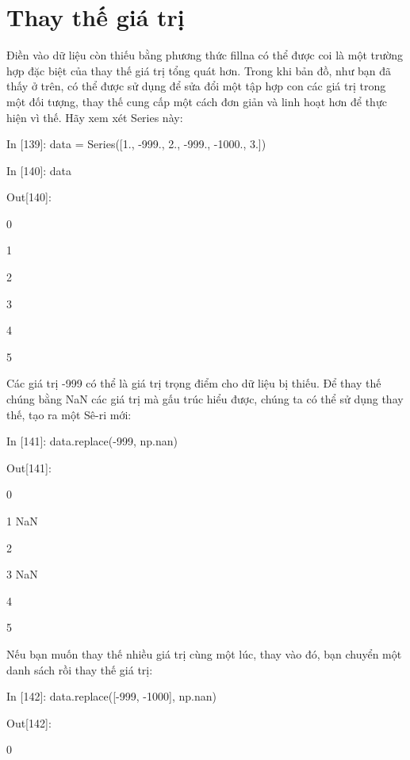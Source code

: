 \section{Thay thế giá trị}
Điền vào dữ liệu còn thiếu bằng phương thức fillna có thể được coi là một trường hợp đặc biệt của 
thay thế giá trị tổng quát hơn. Trong khi bản đồ, như bạn đã thấy ở trên, có thể được sử dụng để sửa đổi 
một tập hợp con các giá trị trong một đối tượng, thay thế cung cấp một cách đơn giản và linh hoạt hơn để thực hiện 
vì thế. Hãy xem xét Series này:\par
    \quad\textup{In [139]: data = Series([1., -999., 2., -999., -1000., 3.])  }\par
    \quad\textup{In [140]: data   }\par
    \quad\textup{Out[140]: }\par
    \quad\textup{0  }\par
    \quad\textup{1    }\par
    \quad\textup{2  }\par
    \quad\textup{3   }\par
    \quad\textup{4  }\par
    \quad\textup{5  }\par
Các giá trị -999 có thể là giá trị trọng điểm cho dữ liệu bị thiếu. Để thay thế chúng bằng NaN 
các giá trị mà gấu trúc hiểu được, chúng ta có thể sử dụng thay thế, tạo ra một Sê-ri mới: \par
    \quad\textup{In [141]: data.replace(-999, np.nan)}\par
    \quad\textup{Out[141]:    }\par
    \quad\textup{0    }\par
    \quad\textup{1   \quad  NaN  }\par
    \quad\textup{2  }\par
    \quad\textup{3  \quad NaN }\par
    \quad\textup{4  }\par
    \quad\textup{5  }\par
Nếu bạn muốn thay thế nhiều giá trị cùng một lúc, thay vào đó, bạn chuyển một danh sách rồi thay thế giá trị: \par
    \quad\textup{In [142]: data.replace([-999, -1000], np.nan)}\par
    \quad\textup{Out[142]:    }\par
    \quad\textup{0    }\par
